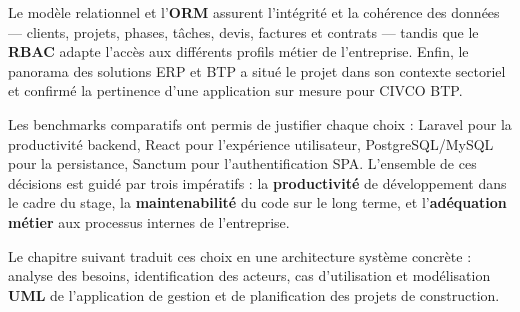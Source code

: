 \medskip

Le modèle relationnel et l'\textbf{ORM} assurent l'intégrité et la cohérence des
données --- clients, projets, phases, tâches, devis, factures et contrats --- tandis
que le \textbf{RBAC} adapte l'accès aux différents profils métier de l'entreprise.
Enfin, le panorama des solutions ERP et BTP a situé le projet dans son contexte
sectoriel et confirmé la pertinence d'une application sur mesure pour CIVCO BTP.

\medskip

Les benchmarks comparatifs ont permis de justifier chaque choix : Laravel pour la
productivité backend, React pour l'expérience utilisateur, PostgreSQL/MySQL pour la
persistance, Sanctum pour l'authentification SPA. L'ensemble de ces décisions est
guidé par trois impératifs : la \textbf{productivité} de développement dans le cadre
du stage, la \textbf{maintenabilité} du code sur le long terme, et l'\textbf{adéquation
métier} aux processus internes de l'entreprise.

\medskip

Le chapitre suivant traduit ces choix en une architecture système concrète : analyse
des besoins, identification des acteurs, cas d'utilisation et modélisation
\textbf{UML} de l'application de gestion et de planification des projets de
construction.

\newpage

